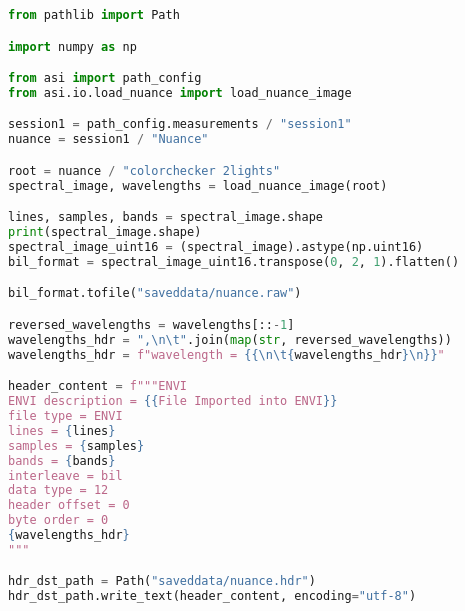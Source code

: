 \begin{lstlisting}[language=python, caption=Save nuance image as ENVI format, label={code:save-nuance}]
from pathlib import Path

import numpy as np

from asi import path_config
from asi.io.load_nuance import load_nuance_image

session1 = path_config.measurements / "session1"
nuance = session1 / "Nuance"

root = nuance / "colorchecker 2lights"
spectral_image, wavelengths = load_nuance_image(root)

lines, samples, bands = spectral_image.shape
print(spectral_image.shape)
spectral_image_uint16 = (spectral_image).astype(np.uint16)
bil_format = spectral_image_uint16.transpose(0, 2, 1).flatten()

bil_format.tofile("saveddata/nuance.raw")

reversed_wavelengths = wavelengths[::-1]
wavelengths_hdr = ",\n\t".join(map(str, reversed_wavelengths))
wavelengths_hdr = f"wavelength = {{\n\t{wavelengths_hdr}\n}}"

header_content = f"""ENVI
ENVI description = {{File Imported into ENVI}}
file type = ENVI
lines = {lines}
samples = {samples}
bands = {bands}
interleave = bil
data type = 12
header offset = 0
byte order = 0
{wavelengths_hdr}
"""

hdr_dst_path = Path("saveddata/nuance.hdr")
hdr_dst_path.write_text(header_content, encoding="utf-8")
\end{lstlisting}